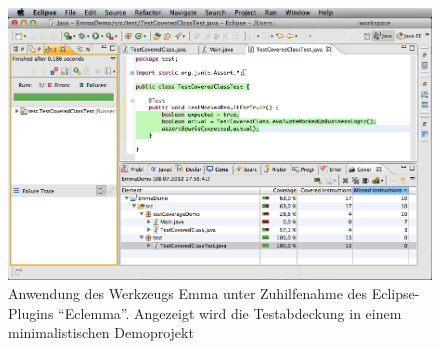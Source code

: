 \newpage

\begin{figure}
\centering
\includegraphics[width=1\textwidth]{eclemma}
\caption{Anwendung des Werkzeugs Emma unter Zuhilfenahme des Eclipse-Plugins ``Eclemma''. Angezeigt wird die Testabdeckung in einem minimalistischen Demoprojekt}
\label{fig:eclemma}
\end{figure}